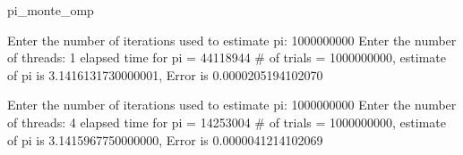 \documentclass[11pt, letterpaper]{article}
\begin{document}
	\noindent \large pi\_monte\_omp
	
	\begin{small}	
		
		\noindent Enter the number of iterations used to estimate pi: 1000000000\newline
		Enter the number of threads: 1\newline
		elapsed time for pi = 44118944\newline
		\# of trials = 1000000000, estimate of pi is  3.1416131730000001, Error is 0.0000205194102070\newline
		
		\noindent Enter the number of iterations used to estimate pi: 1000000000\newline
		Enter the number of threads: 4\newline
		elapsed time for pi = 14253004\newline
		\# of trials = 1000000000, estimate of pi is  3.1415967750000000, Error is 0.0000041214102069\newline
		
	\end{small}
	
\end{document}
